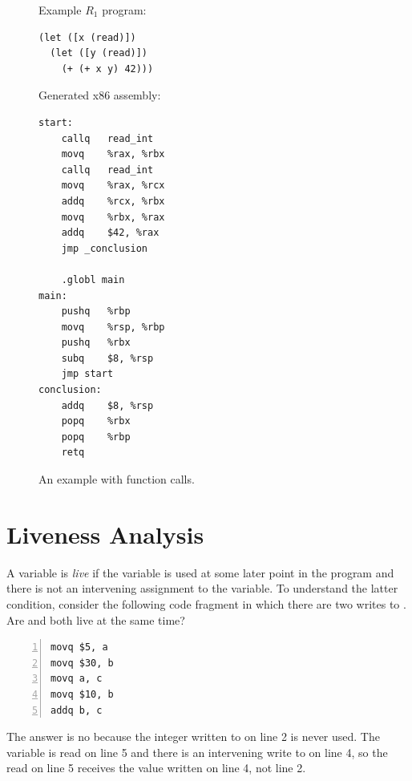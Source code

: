 \documentclass[11pt]{book}
\begin{document}
\begin{figure}[tp]
\begin{minipage}{0.45\textwidth}
Example $R_1$ program:
\begin{lstlisting}
(let ([x (read)])
  (let ([y (read)])
    (+ (+ x y) 42)))
\end{lstlisting}
\end{minipage}
\begin{minipage}{0.45\textwidth}
Generated x86 assembly:
\begin{lstlisting}
start:
	callq	read_int
	movq	%rax, %rbx
	callq	read_int
	movq	%rax, %rcx
	addq	%rcx, %rbx
	movq	%rbx, %rax
	addq	$42, %rax
	jmp _conclusion

	.globl main
main:
	pushq	%rbp
	movq	%rsp, %rbp
	pushq	%rbx
	subq	$8, %rsp
	jmp start
conclusion:
	addq	$8, %rsp
	popq	%rbx
	popq	%rbp
	retq
\end{lstlisting}
\end{minipage}
\caption{An example with function calls.}
  \label{fig:example-calling-conventions}
\end{figure}




\section{Liveness Analysis}
\label{sec:liveness-analysis-r1}

A variable is \emph{live} if the variable is used at some later point
in the program and there is not an intervening assignment to the
variable.
%
To understand the latter condition, consider the following code
fragment in which there are two writes to . Are  and
 both live at the same time?
\begin{lstlisting}[numbers=left,numberstyle=\tiny]
movq $5, a
movq $30, b
movq a, c
movq $10, b
addq b, c
\end{lstlisting}
The answer is no because the integer  written to  on
line 2 is never used. The variable  is read on line 5 and
there is an intervening write to  on line 4, so the read on
line 5 receives the value written on line 4, not line 2.
\end{document}

